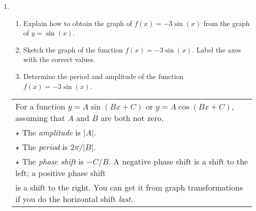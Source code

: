\begin{enumerate}
\item
  \begin{enumerate}
  \item Explain how to obtain the graph of $f(x)=-3\sin(x)$ from the graph of $y=\sin(x)$.\\[.5in]
    \vfill

    
  \item Sketch the graph of the function $f(x)= -3\sin(x)$. Label the
    axes with the correct values.
    
    \noindent

\item Determine the period and amplitude of the function $f(x)= -3\sin(x)$. \\[1in]
\end{enumerate}



\hspace{-.3in} \begin{tabular}{| l | }
\hline 
For a function $y=A\sin(Bx+C)$ or $y=A \cos(Bx+C)$, assuming that $A$ and $B$ are both not zero, \\

$\star$ The \emph{amplitude} is $|A|$.\\
$\star$ The \emph{period} is $2\pi/|B|$.   \\
$\star$ The \emph{phase shift} is $-C/B$. A negative phase shift is a shift to the left; a positive phase shift\\ is a shift to the right. You can get it from graph transformations if you do the horizontal shift \emph{last}.%
\\ \hline
\end{tabular}


\end{enumerate}

